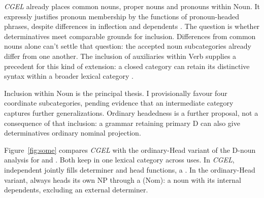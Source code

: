 \documentclass[12pt]{article}
\begin{document}
\textit{CGEL} already places common nouns, proper nouns and pronouns within Noun. It expressly justifies pronoun membership by the functions of pronoun-headed phrases, despite differences in inflection and dependents \citep[327--328]{huddleston2002}. The question is whether determinatives meet comparable grounds for inclusion. Differences from common nouns alone can't settle that question: the accepted noun subcategories already differ from one another. The inclusion of auxiliaries within Verb supplies a precedent for this kind of extension: a closed category can retain its distinctive syntax within a broader lexical category \citep{pullumwilson1977}.

Inclusion within Noun is the principal thesis. I provisionally favour four coordinate subcategories, pending evidence that an intermediate category captures further generalizations. Ordinary headedness is a further proposal, not a consequence of that inclusion: a grammar retaining primary D can also give determinatives ordinary nominal projection.

Figure~\ref{fig:some} compares \textit{CGEL} with the ordinary-Head variant of the D-noun analysis for  and . Both keep  in one lexical category across uses. In \textit{CGEL}, independent  jointly fills determiner and head functions, a  \citep[410--412]{huddleston2002}. In the ordinary-Head variant,  always heads its own NP through a  (Nom): a noun with its internal dependents, excluding an external determiner.
\end{document}
